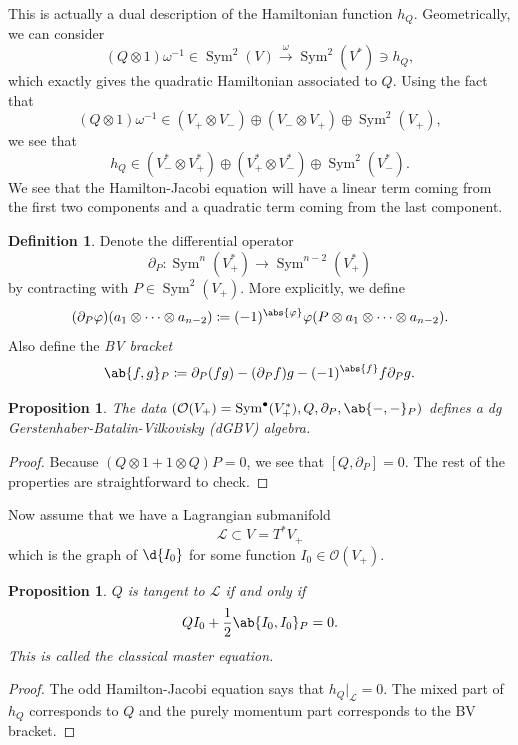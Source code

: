\documentclass[article,10pt,oneside,oldfontcommands]{memoir}
\newtheorem{prop}[thm]{Proposition}
\theoremstyle{definition}
\newtheorem{defn}[thm]{Definition}
\theoremstyle{remark}
\theoremstyle{plain}
\theoremstyle{definition}
\theoremstyle{remark}
\newcommand{\mc}[1]{\mathcal{#1}}
\newcommand{\on}[1]{\operatorname{#1}}
\newcommand{\1}{\mathbf{1}}
\newcommand{\2}{\mathbf{2}}
\newcommand{\3}{\mathbf{3}}
\DeclareMathOperator{\Sym}{Sym}
\begin{document}
This is actually a dual description of the Hamiltonian function \(h_Q\). Geometrically, we can consider
\[ (Q \otimes 1) \omega^{-1} \in \on{Sym}^2(V) \xrightarrow{\omega} \on{Sym}^2(V^*) \ni h_Q, \]
which exactly gives the quadratic Hamiltonian associated to \(Q\). Using the fact that
\[ (Q \otimes 1) \omega^{-1} \in (V_+ \otimes V_-) \oplus (V_- \otimes V_+) \oplus \on{Sym}^2(V_+), \]
we see that
\[ h_Q \in (V_-^* \otimes V_+^*) \oplus (V_+^* \otimes V_-^*) \oplus \on{Sym}^2(V_-^*). \]
We see that the Hamilton-Jacobi equation will have a linear term coming from the first two components and a quadratic term coming from the last component.

\begin{defn}
    Denote the differential operator
    \[ \partial_P \colon \on{Sym}^n(V_+^*) \to \on{Sym}^{n-2}(V_+^*) \]
    by contracting with \(P \in \on{Sym}^2(V_+)\). More explicitly, we define
    \[ (\partial_P \varphi)(a_1 \otimes \cdots \otimes a_{n-2}) \coloneqq (-1)^{\abs{\varphi}} \varphi(P \otimes a_1 \otimes \cdots \otimes a_{n-2}). \]
    Also define the \textit{BV bracket}
    \[ \ab\{ f, g\}_P \coloneqq \partial_P(fg) - (\partial_P f) g - (-1)^{\abs{f}} f \partial_P g. \]
\end{defn}

\begin{prop}
    The data \((\mc{O}(V_+) = \Sym^{\bullet}(V_+^*), Q, \partial_P, \ab\{-,-\}_P)\) defines a dg Gerstenhaber-Batalin-Vilkovisky (dGBV) algebra.
\end{prop}

\begin{proof}
    Because \((Q \otimes 1 + 1 \otimes Q)P = 0\), we see that \([Q, \partial_P] = 0\). The rest of the properties are straightforward to check.
\end{proof}

Now assume that we have a Lagrangian submanifold
\[ \mc{L} \subset V = T^* V_+ \]
which is the graph of \(\d{I_0}\) for some function \(I_0 \in \mc{O}(V_+)\).
\begin{prop}
    \(Q\) is tangent to \(\mc{L}\) if and only if
    \[ Q I_0 + \frac{1}{2} \ab\{I_0, I_0\}_P = 0. \]
    This is called the \textit{classical master equation}.
\end{prop}

\begin{proof}
    The odd Hamilton-Jacobi equation says that \(h_Q |_{\mc{L}} = 0\). The mixed part of \(h_Q\) corresponds to \(Q\) and the purely momentum part corresponds to the BV bracket. 
\end{proof}
\end{document}
